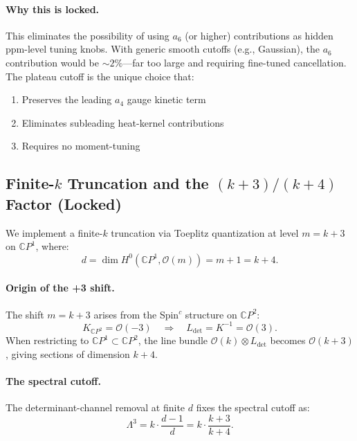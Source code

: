 \paragraph{Why this is locked.}
This eliminates the possibility of using $a_6$ (or higher) contributions as hidden ppm-level tuning knobs. With generic smooth cutoffs (e.g., Gaussian), the $a_6$ contribution would be $\sim 2\%$---far too large and requiring fine-tuned cancellation. The plateau cutoff is the unique choice that:
\begin{enumerate}
\item Preserves the leading $a_4$ gauge kinetic term
\item Eliminates subleading heat-kernel contributions
\item Requires no moment-tuning
\end{enumerate}

\subsection{Finite-$k$ Truncation and the $(k+3)/(k+4)$ Factor (Locked)}\label{sec:alpha-finite-k}

We implement a finite-$k$ truncation via Toeplitz quantization at level $m = k + 3$ on $\mathbb{C}P^1$, where:
\begin{equation}\label{eq:d-dimension}
d = \dim H^0(\mathbb{C}P^1, \mathcal{O}(m)) = m + 1 = k + 4.
\end{equation}

\paragraph{Origin of the +3 shift.}
The shift $m = k + 3$ arises from the Spin$^c$ structure on $\mathbb{C}P^2$:
\begin{equation}
K_{\mathbb{C}P^2} = \mathcal{O}(-3) \quad \Rightarrow \quad L_{\det} = K^{-1} = \mathcal{O}(3).
\end{equation}
When restricting to $\mathbb{C}P^1 \subset \mathbb{C}P^2$, the line bundle $\mathcal{O}(k) \otimes L_{\det}$ becomes $\mathcal{O}(k+3)$, giving sections of dimension $k + 4$.

\paragraph{The spectral cutoff.}
The determinant-channel removal at finite $d$ fixes the spectral cutoff as:
\begin{equation}\label{eq:lambda-cutoff}
\Lambda^3 = k \cdot \frac{d-1}{d} = k \cdot \frac{k+3}{k+4}.
\end{equation}


